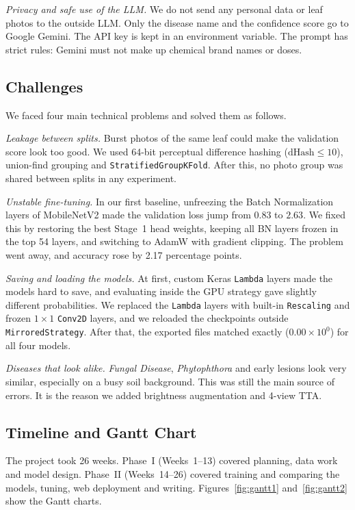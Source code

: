 \textit{Privacy and safe use of the LLM.} We do not send any personal data or leaf photos to the outside LLM. Only the disease name and the confidence score go to Google Gemini. The API key is kept in an environment variable. The prompt has strict rules: Gemini must not make up chemical brand names or doses.

\subsection{Challenges}
We faced four main technical problems and solved them as follows.

\textit{Leakage between splits.} Burst photos of the same leaf could make the validation score look too good. We used 64-bit perceptual difference hashing ($\text{dHash} \le 10$), union-find grouping and \texttt{StratifiedGroupKFold}. After this, no photo group was shared between splits in any experiment.

\textit{Unstable fine-tuning.} In our first baseline, unfreezing the Batch Normalization layers of MobileNetV2 made the validation loss jump from $0.83$ to $2.63$. We fixed this by restoring the best Stage~1 head weights, keeping all BN layers frozen in the top 54 layers, and switching to AdamW with gradient clipping. The problem went away, and accuracy rose by 2.17 percentage points.

\textit{Saving and loading the models.} At first, custom Keras \texttt{Lambda} layers made the models hard to save, and evaluating inside the GPU strategy gave slightly different probabilities. We replaced the \texttt{Lambda} layers with built-in \texttt{Rescaling} and frozen $1 \times 1$ \texttt{Conv2D} layers, and we reloaded the checkpoints outside \texttt{MirroredStrategy}. After that, the exported files matched exactly ($0.00 \times 10^{0}$) for all four models.

\textit{Diseases that look alike.} \textit{Fungal Disease}, \textit{Phytophthora} and early lesions look very similar, especially on a busy soil background. This was still the main source of errors. It is the reason we added brightness augmentation and 4-view TTA.

\subsection{Timeline and Gantt Chart}
The project took 26 weeks. Phase~I (Weeks~1--13) covered planning, data work and model design. Phase~II (Weeks~14--26) covered training and comparing the models, tuning, web deployment and writing. Figures~\ref{fig:gantt1} and~\ref{fig:gantt2} show the Gantt charts.

